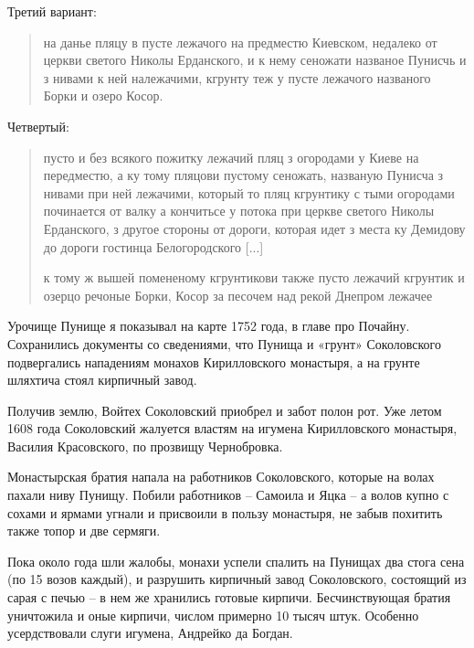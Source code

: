 Третий вариант:

\begin{quotation}
на данье пляцу в пусте лежачого на предместю Киевском, недалеко от церкви светого Николы Ерданского, и к нему сеножати названое Пунисчь и з нивами к ней належачими, кгрунту теж у пусте лежачого названого Борки и озеро Косор.
\end{quotation}

Четвертый:

\begin{quotation}
пусто и без всякого пожитку лежачий пляц з огородами у Киеве на передместю, а ку тому пляцови пустому сеножать, названую Пунисча з нивами при ней лежачими, который то пляц кгрунтику с тыми огородами починается от валку а кончитьсе у потока при церкве светого Николы Ерданского, з другое стороны от дороги, которая идет з места ку Демидову до дороги гостинца Белогородского [...]

к тому ж вышей помененому кгрунтикови также пусто лежачий кгрунтик и озерцо речоные Борки, Косор за песочем над рекой Днепром лежачее
\end{quotation}

Урочище Пунище я показывал на карте 1752 года, в главе про Почайну. Сохранились документы со сведениями, что Пунища и «грунт» Соколовского подвергались нападениям монахов Кирилловского монастыря, а на грунте шляхтича стоял кирпичный завод. 


Получив землю, Войтех Соколовский приобрел и забот полон рот. Уже летом 1608 года Соколовский жалуется властям на игумена Кирилловского монастыря, Василия Красовского, по прозвищу Чернобровка.

Монастырская братия напала на работников Соколовского, которые на волах пахали ниву Пунищу. Побили работников – Самоила и Яцка – а волов купно с сохами и ярмами угнали и присвоили в пользу монастыря, не забыв похитить также топор и две сермяги. 

Пока около года шли жалобы, монахи успели спалить на Пунищах два стога сена (по 15 возов каждый), и разрушить кирпичный завод Соколовского, состоящий из сарая с печью – в нем же хранились готовые кирпичи. Бесчинствующая братия уничтожила и оные кирпичи, числом примерно 10 тысяч штук. Особенно усердствовали слуги игумена, Андрейко да Богдан.

